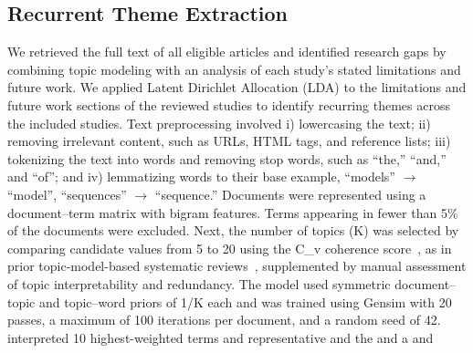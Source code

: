 \subsection{Recurrent Theme Extraction}
We retrieved the full text of all eligible articles and identified research gaps by combining topic modeling with an analysis of each study's stated limitations and future work. We applied Latent Dirichlet Allocation (LDA) \cite{blei2003latent} to the limitations and future work sections of the reviewed studies to identify recurring themes across the included studies. Text preprocessing involved i) lowercasing the text; ii) removing irrelevant content, such as URLs, HTML tags, and reference lists; iii) tokenizing the text into words and removing stop words, such as ``the,'' ``and,'' and ``of''; and iv) lemmatizing words \cite{khyani2021interpretation} to their base  example, ``models'' $\rightarrow$ ``model'', ``sequences'' $\rightarrow$ ``sequence.'' Documents were represented using a document--term matrix with bigram features. Terms appearing in fewer than 5\% of the documents were excluded. Next, the number of topics (K) was selected by comparing candidate values from 5 to 20 using the C\_v coherence score~\cite{roder2015exploring}, as in prior topic-model-based systematic reviews~\cite{ogunleye2024systematic}, supplemented by manual assessment of topic interpretability and redundancy. The model used symmetric document--topic and topic--word priors of 1/K each and was trained using Gensim with 20 passes, a maximum of 100 iterations per document, and a random seed of 42.   interpreted    10 highest-weighted terms and representative  and  the   and  a       and       

